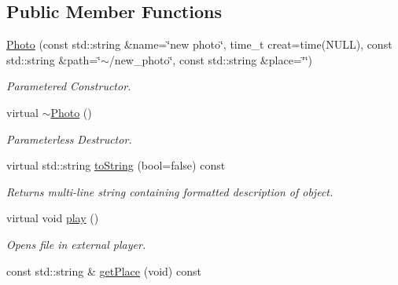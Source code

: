 \subsection*{Public Member Functions}
\begin{DoxyCompactItemize}
\item 
\hypertarget{classPhoto_ab07e00487a31f231f4730b3859664da5}{\hyperlink{classPhoto_ab07e00487a31f231f4730b3859664da5}{Photo} (const std\-::string \&name=\char`\"{}new photo\char`\"{}, time\-\_\-t creat=time(N\-U\-L\-L), const std\-::string \&path=\char`\"{}$\sim$/new\-\_\-photo\char`\"{}, const std\-::string \&place=\char`\"{}\char`\"{})}\label{classPhoto_ab07e00487a31f231f4730b3859664da5}

\begin{DoxyCompactList}\small\item\em Parametered Constructor. \end{DoxyCompactList}\item 
virtual \hyperlink{classPhoto_adc366234be6226600360c7cbba8e7fcf}{$\sim$\-Photo} ()
\begin{DoxyCompactList}\small\item\em Parameterless Destructor. \end{DoxyCompactList}\item 
\hypertarget{classPhoto_a9ea8f215df772495c523a8ba82e3586c}{virtual std\-::string \hyperlink{classPhoto_a9ea8f215df772495c523a8ba82e3586c}{to\-String} (bool=false) const }\label{classPhoto_a9ea8f215df772495c523a8ba82e3586c}

\begin{DoxyCompactList}\small\item\em Returns multi-\/line string containing formatted description of object. \end{DoxyCompactList}\item 
\hypertarget{classPhoto_a145e0540284cbc678ef5bdb02a8fcaa8}{virtual void \hyperlink{classPhoto_a145e0540284cbc678ef5bdb02a8fcaa8}{play} ()}\label{classPhoto_a145e0540284cbc678ef5bdb02a8fcaa8}

\begin{DoxyCompactList}\small\item\em Opens file in external player. \end{DoxyCompactList}\item 
\hypertarget{classPhoto_a310123a0d107ab078bc83a80b484e2c1}{const std\-::string \& \hyperlink{classPhoto_a310123a0d107ab078bc83a80b484e2c1}{get\-Place} (void) const }\label{classPhoto_a310123a0d107ab078bc83a80b484e2c1}


\end{DoxyCompactItemize}
